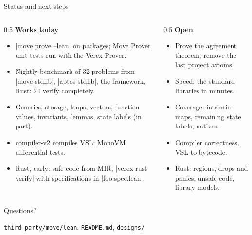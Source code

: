 \documentclass[aspectratio=169,11pt]{beamer}
\begin{document}
\begin{frame}[fragile]{Status and next steps}
  \begin{columns}[T]
    \begin{column}{0.5\textwidth}
      \textbf{Works today}
      \begin{itemize}\setlength{\itemsep}{1pt}\small
        \item |move prove --lean| on packages; Move Prover unit tests run with the Verex Prover.
        \item Nightly benchmark of 32 problems from |move-stdlib|, |aptos-stdlib|, the framework, Rust: 24 verify completely.
        \item Generics, storage, loops, vectors, function values, invariants, lemmas, state labels (in part).
        \item compiler-v2 compiles VSL; MonoVM differential tests.
        \item Rust, early: safe code from MIR, |verex-rust verify| with specifications in |foo.spec.lean|.
      \end{itemize}
    \end{column}
    \begin{column}{0.5\textwidth}
      \textbf{Open}
      \begin{itemize}\setlength{\itemsep}{1pt}\small
        \item Prove the agreement theorem; remove the last project axioms.
        \item Speed: the standard libraries in minutes.
        \item Coverage: intrinsic maps, remaining state labels, natives.
        \item Compiler correctness, VSL to bytecode.
        \item Rust: regions, drops and panics, unsafe code, library models.
      \end{itemize}
    \end{column}
  \end{columns}
\end{frame}

\begin{frame}[standout]
  Questions?
  \vspace{0.8em}

  \small
  \texttt{third\_party/move/lean}: \texttt{README.md}, \texttt{designs/}
\end{frame}
\end{document}
